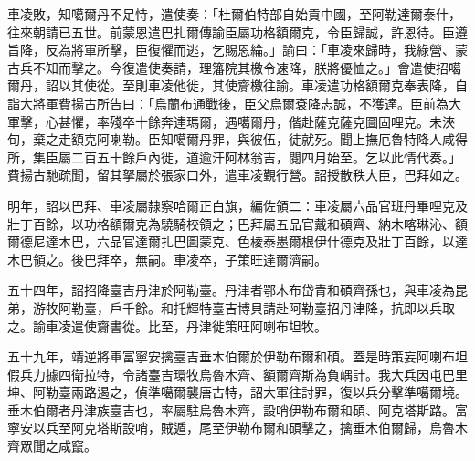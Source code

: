 \begin{pinyinscope}
車凌敗，知噶爾丹不足恃，遣使奏：「杜爾伯特部自始貢中國，至阿勒達爾泰什，往來朝請已五世。前蒙恩遣巴扎爾傳諭臣屬功格額爾克，令臣歸誠，許恩待。臣遵旨降，反為將軍所擊，臣復懼而逃，乞賜恩綸。」諭曰：「車凌來歸時，我綠營、蒙古兵不知而擊之。今復遣使奏請，理籓院其檄令速降，朕將優恤之。」會遣使招噶爾丹，詔以其使從。至則車凌他徙，其使齎檄往諭。車凌遣功格額爾克奉表降，自詣大將軍費揚古所告曰：「烏蘭布通戰後，臣父烏爾袞降志誠，不獲達。臣前為大軍擊，心甚懼，率殘卒十餘奔達瑪爾，遇噶爾丹，偕赴薩克薩克圖固哩克。未浹旬，棄之走額克阿喇勒。臣知噶爾丹罪，與彼伍，徒就死。聞上撫厄魯特降人咸得所，集臣屬二百五十餘戶內徙，道逾汗阿林翁吉，閱四月始至。乞以此情代奏。」費揚古馳疏聞，留其拏屬於張家口外，遣車凌覲行營。詔授散秩大臣，巴拜如之。

明年，詔以巴拜、車凌屬隸察哈爾正白旗，編佐領二：車凌屬六品官班丹畢哩克及壯丁百餘，以功格額爾克為驍騎校領之；巴拜屬五品官戴和碩齊、納木喀琳沁、額爾德尼達木巴，六品官達爾扎巴圖蒙克、色棱泰墨爾根伊什德克及壯丁百餘，以達木巴領之。後巴拜卒，無嗣。車凌卒，子策旺達爾濟嗣。

五十四年，詔招降臺吉丹津於阿勒臺。丹津者鄂木布岱青和碩齊孫也，與車凌為昆弟，游牧阿勒臺，戶千餘。和托輝特臺吉博貝請赴阿勒臺招丹津降，抗即以兵取之。諭車凌遣使齎書從。比至，丹津徙策旺阿喇布坦牧。

五十九年，靖逆將軍富寧安擒臺吉垂木伯爾於伊勒布爾和碩。蓋是時策妄阿喇布坦假兵力據四衛拉特，令諸臺吉環牧烏魯木齊、額爾齊斯為負嵎計。我大兵因屯巴里坤、阿勒臺兩路遏之，偵準噶爾襲唐古特，詔大軍往討罪，復以兵分擊準噶爾境。垂木伯爾者丹津族臺吉也，率屬駐烏魯木齊，設哨伊勒布爾和碩、阿克塔斯路。富寧安以兵至阿克塔斯設哨，賊遁，尾至伊勒布爾和碩擊之，擒垂木伯爾歸，烏魯木齊眾聞之咸竄。


\end{pinyinscope}
